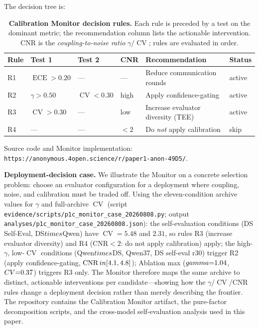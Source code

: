 \documentclass[11pt]{article}
\DeclareMathOperator{\CV}{CV}
\DeclareMathOperator{\ECE}{ECE}
\DeclareMathOperator{\CNR}{CNR}
\begin{document}
The decision tree is:

\begin{table}[t]
\centering
\caption{\textbf{Calibration Monitor decision rules.} Each rule is preceded by a test on the dominant metric; the recommendation column lists the actionable intervention. CNR is the \textit{coupling-to-noise ratio} $\gamma / \CV$; rules are evaluated in order.}
\label{tab:monitor}
\small
\begin{tabular}{@{}p{2.2cm}p{2.0cm}p{2.0cm}p{2.0cm}p{3.6cm}p{2.4cm}@{}}
\toprule
\textbf{Rule} & \textbf{Test 1} & \textbf{Test 2} & \textbf{CNR} & \textbf{Recommendation} & \textbf{Status} \\
\midrule
R1 & $\ECE > 0.20$ & --- & --- & Reduce communication rounds               & active \\
R2 & $\gamma > 0.50$ & $\CV < 0.30$ & high & Apply confidence-gating                 & active \\
R3 & $\CV > 0.30$    & ---          & low  & Increase evaluator diversity (TEE)     & active \\
R4 & ---             & ---          & $<2$ & Do \emph{not} apply calibration         & skip   \\
\bottomrule
\end{tabular}
\end{table}

\noindent Source code and Monitor implementation: \texttt{https:/\allowbreak /\allowbreak anonymous.4open.\allowbreak science/\allowbreak r/\allowbreak paper1-\allowbreak anon-49D5/\allowbreak }.

\noindent\textbf{Deployment-decision case.} We illustrate the Monitor on a concrete selection problem: choose an evaluator configuration for a deployment where coupling, noise, and calibration must be traded off. Using the eleven-condition archive values for $\gamma$ and full-archive $\CV$ (script \texttt{evidence/scripts/p1c\_monitor\_case\_20260808.py}; output \texttt{analyses/p1c\_monitor\_case\_20260808.json}): the self-evaluation conditions (DS Self-Eval, DS$\\times$Qwen) have $\CV{=}5.48$ and $2.31$, so rules R3 (increase evaluator diversity) and R4 (CNR$<2$: do not apply calibration) apply; the high-$\gamma$, low-$\CV$ conditions (Qwen$\\times$DS, Qwen37, DS self-eval r30) trigger R2 (apply confidence-gating, $\CNR \\in [4.1, 4.8]$); Ablation max ($\\gamma{=}1.04$, $\\CV{=}0.37$) triggers R3 only. The Monitor therefore maps the same archive to distinct, actionable interventions per candidate---showing how the $\gamma$/$\CV$/CNR rules change a deployment decision rather than merely describing the frontier.
The repository contains the Calibration Monitor artifact, the pure-factor decomposition scripts, and the cross-model self-evaluation analysis used in this paper.
\end{document}
